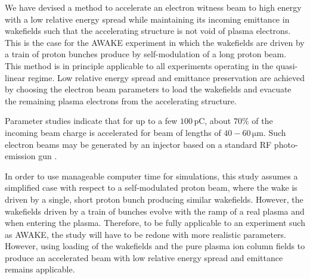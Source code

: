 \documentclass[aps,prstab,reprint,amsmath,amssymb,groupedaddress]{revtex4-1}
\newcommand{\unit}[1]{\,\mathrm{#1}}
\begin{document}


We have devised a method to accelerate an electron witness beam to high energy with a low relative energy spread while
maintaining its incoming emittance in wakefields such that the accelerating structure is not void of plasma electrons.
This is the case for the AWAKE experiment in which the wakefields are driven by a train of proton bunches produce by
self-modulation of a long proton beam. This method is in principle applicable to all experiments operating in the
quasi-linear regime. Low relative energy spread and emittance preservation are achieved by choosing the electron beam
parameters to load the wakefields and evacuate the remaining plasma electrons from the accelerating structure.
 
Parameter studies indicate that for up to a few $100\unit{pC}$, about $70\%$ of the incoming beam charge is accelerated
for beam of lengths of $40-60\unit{\mu m}$. Such electron beams may be generated by an injector based on a standard
RF photo-emission gun \cite{doebert:corr}.

In order to use manageable computer time for simulations, this study assumes a simplified case with respect to a
self-modulated proton beam, where the wake is driven by a single, short proton bunch producing similar wakefields.
However, the wakefields driven by a train of bunches evolve with the ramp of a real plasma and when entering the plasma.
Therefore, to be fully applicable to an experiment such as AWAKE, the study will have to be redone with more realistic
parameters. However, using loading of the wakefields and the pure plasma ion column fields to produce an accelerated
beam with low relative energy spread and emittance remains applicable.
\end{document}
